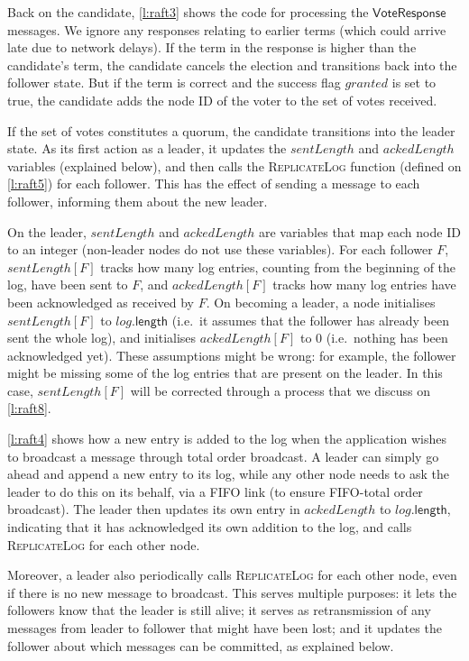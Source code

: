Back on the candidate, \autoref{l:raft3} shows the code for processing the $\mathsf{VoteResponse}$ messages.
We ignore any responses relating to earlier terms (which could arrive late due to network delays).
If the term in the response is higher than the candidate's term, the candidate cancels the election and transitions back into the follower state.
But if the term is correct and the success flag $\mathit{granted}$ is set to true, the candidate adds the node ID of the voter to the set of votes received.

If the set of votes constitutes a quorum, the candidate transitions into the leader state.
As its first action as a leader, it updates the $\mathit{sentLength}$ and $\mathit{ackedLength}$ variables (explained below), and then calls the \textsc{ReplicateLog} function (defined on \autoref{l:raft5}) for each follower.
This has the effect of sending a message to each follower, informing them about the new leader.

On the leader, $\mathit{sentLength}$ and $\mathit{ackedLength}$ are variables that map each node ID to an integer (non-leader nodes do not use these variables).
For each follower $F$, $\mathit{sentLength}[F]$ tracks how many log entries, counting from the beginning of the log, have been sent to $F$, and $\mathit{ackedLength}[F]$ tracks how many log entries have been acknowledged as received by $F$.
On becoming a leader, a node initialises $\mathit{sentLength}[F]$ to $\mathit{log}.\mathsf{length}$ (i.e.\ it assumes that the follower has already been sent the whole log), and initialises $\mathit{ackedLength}[F]$ to $0$ (i.e.\ nothing has been acknowledged yet).
These assumptions might be wrong: for example, the follower might be missing some of the log entries that are present on the leader.
In this case, $\mathit{sentLength}[F]$ will be corrected through a process that we discuss on \autoref{l:raft8}.

\autoref{l:raft4} shows how a new entry is added to the log when the application wishes to broadcast a message through total order broadcast.
A leader can simply go ahead and append a new entry to its log, while any other node needs to ask the leader to do this on its behalf, via a FIFO link (to ensure FIFO-total order broadcast).
The leader then updates its own entry in $\mathit{ackedLength}$ to $\mathit{log}.\mathsf{length}$, indicating that it has acknowledged its own addition to the log, and calls \textsc{ReplicateLog} for each other node.

Moreover, a leader also periodically calls \textsc{ReplicateLog} for each other node, even if there is no new message to broadcast.
This serves multiple purposes: it lets the followers know that the leader is still alive; it serves as retransmission of any messages from leader to follower that might have been lost; and it updates the follower about which messages can be committed, as explained below.

